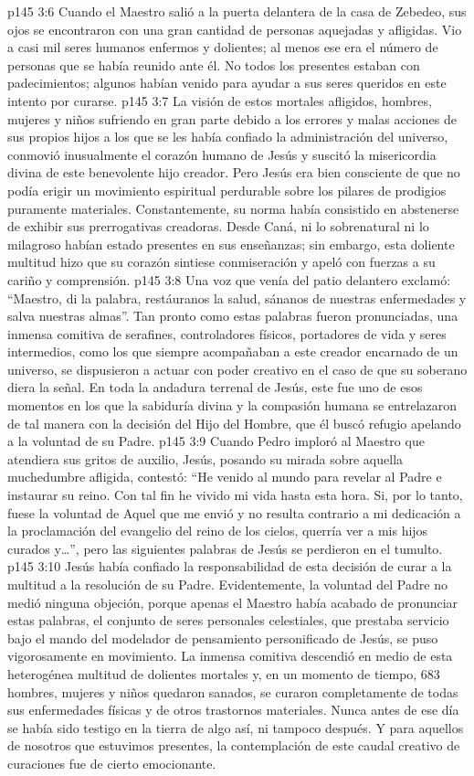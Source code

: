 \vs p145 3:6 Cuando el Maestro salió a la puerta delantera de la casa de Zebedeo, sus ojos se encontraron con una gran cantidad de personas aquejadas y afligidas. Vio a casi mil seres humanos enfermos y dolientes; al menos ese era el número de personas que se había reunido ante él. No todos los presentes estaban con padecimientos; algunos habían venido para ayudar a sus seres queridos en este intento por curarse.
\vs p145 3:7 La visión de estos mortales afligidos, hombres, mujeres y niños sufriendo en gran parte debido a los errores y malas acciones de sus propios hijos a los que se les había confiado la administración del universo, conmovió inusualmente el corazón humano de Jesús y suscitó la misericordia divina de este benevolente hijo creador. Pero Jesús era bien consciente de que no podía erigir un movimiento espiritual perdurable sobre los pilares de prodigios puramente materiales. Constantemente, su norma había consistido en abstenerse de exhibir sus prerrogativas creadoras. Desde Caná, ni lo sobrenatural ni lo milagroso habían estado presentes en sus enseñanzas; sin embargo, esta doliente multitud hizo que su corazón sintiese conmiseración y apeló con fuerzas a su cariño y comprensión.
\vs p145 3:8 Una voz que venía del patio delantero exclamó: “Maestro, di la palabra, restáuranos la salud, sánanos de nuestras enfermedades y salva nuestras almas”. Tan pronto como estas palabras fueron pronunciadas, una inmensa comitiva de serafines, controladores físicos, portadores de vida y seres intermedios, como los que siempre acompañaban a este creador encarnado de un universo, se dispusieron a actuar con poder creativo en el caso de que su soberano diera la señal. En toda la andadura terrenal de Jesús, este fue uno de esos momentos en los que la sabiduría divina y la compasión humana se entrelazaron de tal manera con la decisión del Hijo del Hombre, que él buscó refugio apelando a la voluntad de su Padre.
\vs p145 3:9 Cuando Pedro imploró al Maestro que atendiera sus gritos de auxilio, Jesús, posando su mirada sobre aquella muchedumbre afligida, contestó: “He venido al mundo para revelar al Padre e instaurar su reino. Con tal fin he vivido mi vida hasta esta hora. Si, por lo tanto, fuese la voluntad de Aquel que me envió y no resulta contrario a mi dedicación a la proclamación del evangelio del reino de los cielos, querría ver a mis hijos curados y\ldots ”, pero las siguientes palabras de Jesús se perdieron en el tumulto.
\vs p145 3:10 Jesús había confiado la responsabilidad de esta decisión de curar a la multitud a la resolución de su Padre. Evidentemente, la voluntad del Padre no medió ninguna objeción, porque apenas el Maestro había acabado de pronunciar estas palabras, el conjunto de seres personales celestiales, que prestaba servicio bajo el mando del modelador de pensamiento personificado de Jesús, se puso vigorosamente en movimiento. La inmensa comitiva descendió en medio de esta heterogénea multitud de dolientes mortales y, en un momento de tiempo, 683 hombres, mujeres y niños quedaron sanados, se curaron completamente de todas sus enfermedades físicas y de otros trastornos materiales. Nunca antes de ese día se había sido testigo en la tierra de algo así, ni tampoco después. Y para aquellos de nosotros que estuvimos presentes, la contemplación de este caudal creativo de curaciones fue de cierto emocionante.
